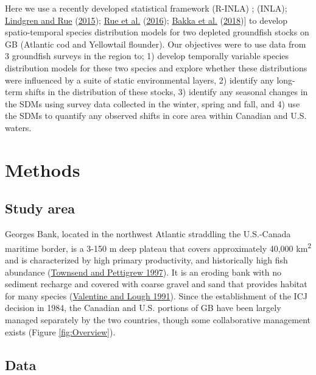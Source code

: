 \documentclass[
]{article}
\begin{document}
Here we use a recently developed statistical framework (R-INLA) ; (INLA); \protect\hyperlink{ref-lindgrenBayesianSpatialModelling2015}{Lindgren and Rue} (\protect\hyperlink{ref-lindgrenBayesianSpatialModelling2015}{2015}); \protect\hyperlink{ref-rueBayesianComputingINLA2016}{Rue et al.} (\protect\hyperlink{ref-rueBayesianComputingINLA2016}{2016}); \protect\hyperlink{ref-bakkaSpatialModellingRINLA2018}{Bakka et al.} (\protect\hyperlink{ref-bakkaSpatialModellingRINLA2018}{2018}){]} to develop spatio-temporal species distribution models for two depleted groundfish stocks on GB (Atlantic cod and Yellowtail flounder). Our objectives were to use data from 3 groundfish surveys in the region to; 1) develop temporally variable species distribution models for these two species and explore whether these distributions were influenced by a suite of static environmental layers, 2) identify any long-term shifts in the distribution of these stocks, 3) identify any seasonal changes in the SDMs using survey data collected in the winter, spring and fall, and 4) use the SDMs to quantify any observed shifts in core area within Canadian and U.S. waters.

\hypertarget{ref-methods}{%
\section{Methods}\label{ref-methods}}

\hypertarget{study-area}{%
\subsection{Study area}\label{study-area}}

Georges Bank, located in the northwest Atlantic straddling the U.S.-Canada maritime border, is a 3-150 m deep plateau that covers approximately 40,000 km\textsuperscript{2} and is characterized by high primary productivity, and historically high fish abundance (\protect\hyperlink{ref-townsendNitrogenLimitationSecondary1997}{Townsend and Pettigrew 1997}). It is an eroding bank with no sediment recharge and covered with coarse gravel and sand that provides habitat for many species (\protect\hyperlink{ref-valentineSeaFloorEnvironment1991}{Valentine and Lough 1991}). Since the establishment of the ICJ decision in 1984, the Canadian and U.S. portions of GB have been largely managed separately by the two countries, though some collaborative management exists (Figure \ref{fig:Overview}).

\hypertarget{data}{%
\subsection{Data}\label{data}}
\end{document}
